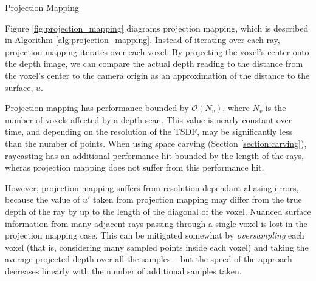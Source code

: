 \documentclass[10pt,twocolumn,letterpaper]{article}
\begin{document}
\begin{algorithm} 
	\caption{Projection Mapping}
	\label{alg:projection_mapping}
	\begin{algorithmic}[1]
		    	\label{alg:line:voxel_carve}
			\EndIf
	    \EndIf
			\label{alg:line:tsdf_update}
		\EndIf
	\EndFor
	\end{algorithmic}
\end{algorithm}



Figure \ref{fig:projection_mapping} diagrams projection mapping, which is
described in Algorithm \ref{alg:projection_mapping}. Instead of iterating over
each ray, projection mapping iterates over each voxel. By projecting the voxel's
center onto the depth image, we can compare the actual depth reading to the
distance from the voxel's center to the camera origin as an approximation of the
distance to the surface, $u$.

Projection mapping has performance bounded by $\mathcal{O}(N_v)$, where $N_v$ is
the number of voxels affected by a depth scan. This value is nearly constant
over time, and depending on the resolution of the TSDF, may be significantly
less than the number of points. When using space carving (Section
\ref{section:carving}), raycasting has an additional performance hit bounded by
the length of the rays, wheras projection mapping does not suffer from this
performance hit. 

However, projection mapping suffers from resolution-dependant aliasing errors,
because the value of $u'$ taken from projection mapping may differ from the true
depth of the ray by up to the length of the diagonal of the voxel. Nuanced
surface information from many adjacent rays passing through a single voxel is
lost in the projection mapping case. This can be mitigated somewhat by
\textit{oversampling} each voxel (that is, considering many sampled points
inside each voxel) and taking the average projected depth over all the samples
-- but the speed of the approach decreases linearly with the number of 
additional samples taken. 
\end{document}
